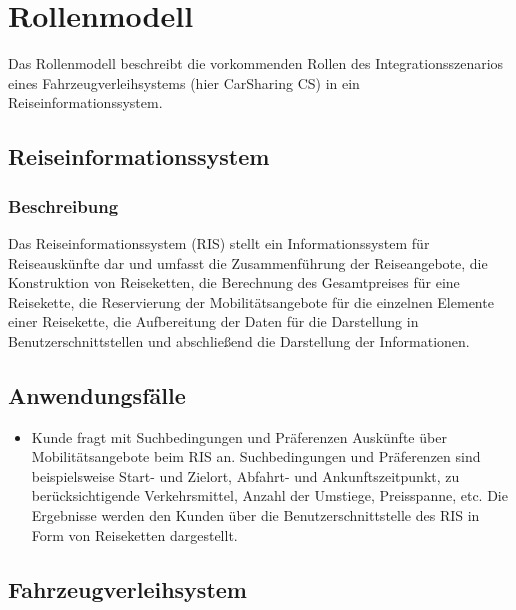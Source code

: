\chapter{Rollenmodell}
\label{sec:Rollenmodell}

Das Rollenmodell beschreibt die vorkommenden Rollen des Integrationsszenarios eines Fahrzeugverleihsystems (hier CarSharing CS) in ein Reiseinformationssystem.

\section{Reiseinformationssystem}

\subsection{Beschreibung}
Das Reiseinformationssystem (RIS) stellt ein Informationssystem für Reiseauskünfte dar und umfasst die Zusammenführung der Reiseangebote, die Konstruktion von Reiseketten, die Berechnung des Gesamtpreises für eine Reisekette, die Reservierung der Mobilitätsangebote für die einzelnen Elemente einer Reisekette, die Aufbereitung der Daten für die Darstellung in Benutzerschnittstellen und abschließend die Darstellung der Informationen.

\section{Anwendungsfälle}
\begin{itemize}
\item Kunde fragt mit Suchbedingungen und Präferenzen Auskünfte über Mobilitätsangebote beim RIS an. Suchbedingungen und Präferenzen sind beispielsweise Start- und Zielort, Abfahrt- und Ankunftszeitpunkt, zu berücksichtigende Verkehrsmittel, Anzahl der Umstiege, Preisspanne, etc. Die Ergebnisse werden den Kunden über die Benutzerschnittstelle des RIS in Form von Reiseketten dargestellt. 
\end{itemize}

\section{Fahrzeugverleihsystem}

